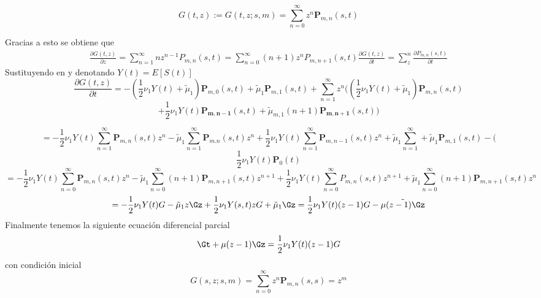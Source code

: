 \begin{equation}
    G(t,z):=G(t,z;s,m)=\sum_{n=0}^\infty z^n \mathbf{P}_{m,n}(s,t)\label{tesis-funcGeneradoraDeM}
\end{equation}

Gracias a esto se obtiene que 
\begin{eqnarray}
    \frac{\partial G(t,z)}{\partial z}=\sum_{n=1}^\infty nz^{n-1}P_{m,n}(s,t)=\sum_{n=0}^\infty (n+1)z^{n}P_{m,n+1}(s,t)
    \frac{\partial G(t,z)}{\partial t} = \sum_z^n \frac{\partial P_{m,n}(s,t)}{\partial t}
\end{eqnarray}
Sustituyendo  en y denotando $Y(t)=E[S(t)]$ $$\frac{\partial G(t,z)}{\partial t} =-(\frac{1}{2}\nu_1Y(t)+\tilde{\mu}_1)\mathbf{P}_{m,0}(s,t)+\tilde{\mu}_1 \mathbf{P}_{m,1}(s,t)+\sum_{n=1}^\infty z^n\big((\frac{1}{2}\nu_1Y(t)+\tilde{\mu}_1)\mathbf{P}_{m,n}(s,t)$$$$+\frac{1}{2}\nu_1Y(t)\mathbf{P_{m,n-1}}(s,t)+\tilde{\mu}_{m,1} (n+1)\mathbf{P_{m,n+1}}(s,t)\big)$$

$$=-\frac{1}{2}\nu_1Y(t)\sum_{n=1}^\infty\mathbf{P}_{m,n}(s,t)z^n-\tilde{\mu}_1\sum_{n=1}^\infty\mathbf{P}_{m.n}(s,t)z^n+\frac{1}{2}\nu_1Y(t)\sum_{n=1}^\infty\mathbf{P}_{m,n-1}(s,t)z^n+\tilde{\mu}_1\sum_{n=1}^\infty+\tilde{\mu}_1\mathbf{P}_{m,1}(s,t)-($$$$\frac{1}{2}\nu_1Y(t)\mathbf{P}_0(t)$$
$$=-\frac{1}{2}\nu_1Y(t)\sum_{n=0}^\infty\mathbf{P}_{m,n}(s,t)z^n-\tilde{\mu}_1\sum_{n=0}^\infty (n+1)\mathbf{P}_{m,n+1}(s,t)z^{n+1}+\frac{1}{2}\nu_1Y(t)\sum_{n=0}^\infty P_{m,n}(s,t)z^{n+1}+\tilde{\mu}_1\sum_{n=0}^\infty(n+1)\mathbf{P}_{m,n+1}(s,t)z^n$$
$$=-\frac{1}{2}\nu_1Y(t)G-\tilde{\mu}_1z\Gz+\frac{1}{2}\nu_1Y(s,t)z G+\tilde{\mu}_1\Gz=\frac{1}{2}\nu_1Y(t)(z-1)G-\tilde{\mu(z-1)\Gz}$$
Finalmente tenemos la siguiente ecuación diferencial parcial
$$ \Gt+\mu(z-1)\Gz=\frac{1}{2}\nu_1Y(t)(z-1)G$$
con condición inicial
$$G(s,z;s,m)=\sum_{n=0}^\infty z^n\mathbf{P}_{m,n}(s,s)=z^m$$